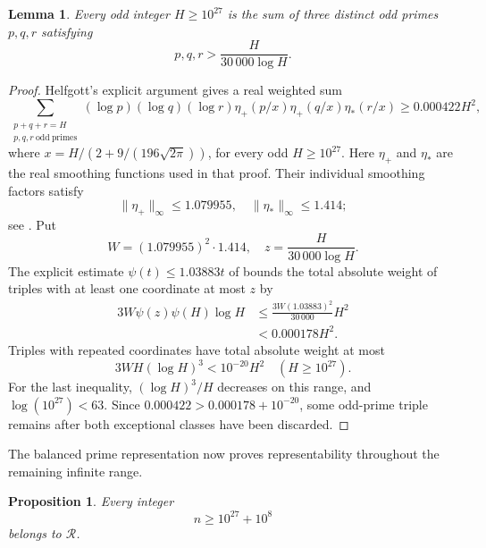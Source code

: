 \documentclass[11pt,letterpaper,reqno]{amsart}
\numberwithin{equation}{section}
\newtheorem{lemma}[theorem]{Lemma}
\newtheorem{proposition}[theorem]{Proposition}
\theoremstyle{remark}
\newcommand{\Rcal}{\mathcal{R}}
\newcommand{\1}{\mathbf 1}
\renewcommand{\leq}{\leqslant}
\renewcommand{\geq}{\geqslant}
\begin{document}
\begin{lemma}\label{lem:fraiture-balanced-goldbach}
Every odd integer $H\geq10^{27}$ is the sum of three distinct odd primes
$p,q,r$ satisfying
\[
 p,q,r>\frac{H}{30\,000\log H}.
\]
\end{lemma}

\begin{proof}
Helfgott's explicit argument
\cite[\S7.4, equations (7.49)--(7.50)]{Helfgott} gives a real
weighted sum
\[
 \sum_{\substack{p+q+r=H\\p,q,r\ \mathrm{odd\ primes}}}
 (\log p)(\log q)(\log r)
 \eta_+(p/x)\eta_+(q/x)\eta_*(r/x)
 \geq0.000422H^2,
\]
where $x=H/(2+9/(196\sqrt{2\pi}))$, for every odd $H\geq10^{27}$.
Here $\eta_+$ and $\eta_*$ are the real smoothing functions used in
that proof. Their individual smoothing
factors satisfy
\[
 \lVert\eta_+\rVert_\infty\leq1.079955,
 \quad
 \lVert\eta_*\rVert_\infty\leq1.414;
\]
see \cite[equations (7.3) and (7.19)]{Helfgott}. Put
\[
 W=(1.079955)^2\cdot1.414,
 \quad z=\frac{H}{30\,000\log H}.
\]
The explicit estimate
$\psi(t)\leq1.03883t$ of
\cite{RosserSchoenfeld} bounds the total absolute weight of triples with
at least one coordinate at most $z$ by
\begin{align*}
 3W\psi(z)\psi(H)\log H
 &\leq\frac{3W(1.03883)^2}{30\,000}H^2\\
 &<0.000178H^2.
\end{align*}
Triples with repeated coordinates have total absolute weight at most
\[
 3WH(\log H)^3<10^{-20}H^2
 \quad(H\geq10^{27}).
\]
For the last inequality, $(\log H)^3/H$ decreases on this range, and
$\log(10^{27})<63$. Since
$0.000422>0.000178+10^{-20}$, some odd-prime triple remains after both
exceptional classes have been discarded.
\end{proof}

The balanced prime representation now proves representability throughout the remaining infinite range.

\begin{proposition}
\label{prop:fraiture-tail}
Every integer
\[
 n\geq10^{27}+10^8
\]
belongs to $\Rcal$.
\end{proposition}
\end{document}
